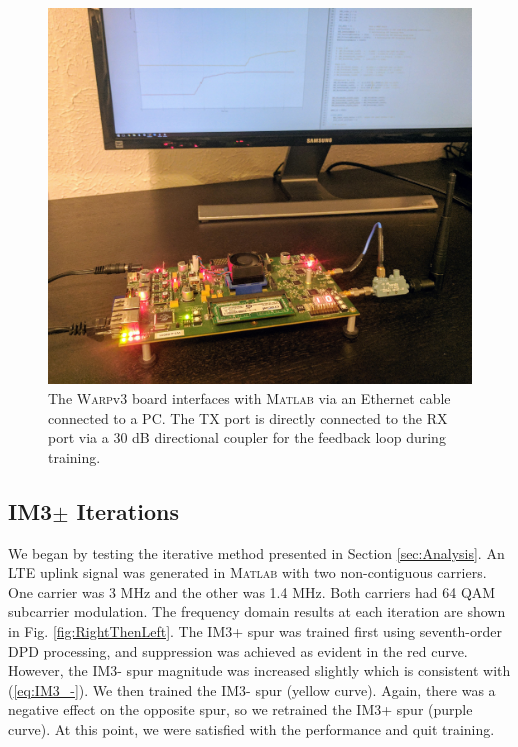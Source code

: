 \begin{figure}[]
	\centering
	\includegraphics[width=0.75\columnwidth]{Setup.jpg}
	\caption{The \textsc{Warp}v3 board interfaces with \textsc{Matlab} via an Ethernet cable connected to a PC. The TX port is directly connected to the RX port via a 30 dB directional coupler for the feedback loop during training.}
	\label{fig:exp_setup}
\end{figure}

\subsection{IM3$\pm$ Iterations}
We began by testing the iterative method presented in Section \ref{sec:Analysis}. 
An LTE uplink signal was generated in \textsc{Matlab} with two non-contiguous carriers. 
One carrier was 3 MHz and the other was 1.4 MHz. 
Both carriers had 64 QAM subcarrier modulation. 
The frequency domain results at each iteration are shown in Fig. \ref{fig:RightThenLeft}. 
The IM3+ spur was trained first using seventh-order DPD processing, and suppression was achieved as evident in the red curve. 
However, the IM3- spur magnitude was increased slightly which is consistent with (\ref{eq:IM3_-}). 
We then trained the IM3- spur (yellow curve). 
Again, there was a negative effect on the opposite spur, so we retrained the IM3+ spur (purple curve). 
At this point, we were satisfied with the performance and quit training. 

